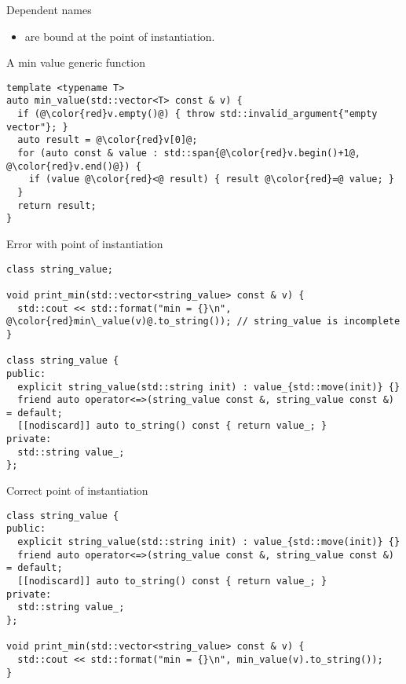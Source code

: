 \begin{frame}[t,fragile]{Dependent names}
\begin{itemize}
  \item {} are bound at the point of instantiation.
\end{itemize}
\begin{block}{A min value generic function}
\begin{lstlisting}[escapechar=@]
template <typename T>
auto min_value(std::vector<T> const & v) {
  if (@\color{red}v.empty()@) { throw std::invalid_argument{"empty vector"}; }
  auto result = @\color{red}v[0]@;
  for (auto const & value : std::span{@\color{red}v.begin()+1@, @\color{red}v.end()@}) {
    if (value @\color{red}<@ result) { result @\color{red}=@ value; }
  }
  return result;
}
\end{lstlisting}
\end{block}
\end{frame}

\begin{frame}[t,fragile]
\begin{block}{Error with point of instantiation}
\begin{lstlisting}[escapechar=@]
class string_value;

void print_min(std::vector<string_value> const & v) {
  std::cout << std::format("min = {}\n", @\color{red}min\_value(v)@.to_string()); // string_value is incomplete
}

class string_value {
public:
  explicit string_value(std::string init) : value_{std::move(init)} {}
  friend auto operator<=>(string_value const &, string_value const &) = default;
  [[nodiscard]] auto to_string() const { return value_; }
private:
  std::string value_;
};
\end{lstlisting}
\end{block}

\end{frame}


\begin{frame}[t,fragile]
\begin{block}{Correct point of instantiation}
\begin{lstlisting}
class string_value {
public:
  explicit string_value(std::string init) : value_{std::move(init)} {}
  friend auto operator<=>(string_value const &, string_value const &) = default;
  [[nodiscard]] auto to_string() const { return value_; }
private:
  std::string value_;
}; 

void print_min(std::vector<string_value> const & v) {
  std::cout << std::format("min = {}\n", min_value(v).to_string());
}

\end{lstlisting}
\end{block}

\end{frame}
